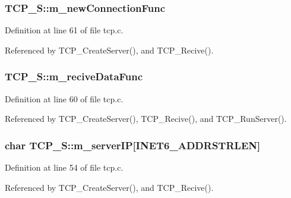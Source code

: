 \subsubsection[{\texorpdfstring{m\+\_\+new\+Connection\+Func}{m_newConnectionFunc}}]{ T\+C\+P\+\_\+\+S\+::m\+\_\+new\+Connection\+Func}\hypertarget{structTCP__S_a56336f3f871b6a2ed804c7d788bc1990}{}\label{structTCP__S_a56336f3f871b6a2ed804c7d788bc1990}


Definition at line 61 of file tcp.\+c.



Referenced by T\+C\+P\+\_\+\+Create\+Server(), and T\+C\+P\+\_\+\+Recive().

\subsubsection[{\texorpdfstring{m\+\_\+recive\+Data\+Func}{m_reciveDataFunc}}]{ T\+C\+P\+\_\+\+S\+::m\+\_\+recive\+Data\+Func}\hypertarget{structTCP__S_ab10be5833a35a4ae1a6e3a96547d5c2b}{}\label{structTCP__S_ab10be5833a35a4ae1a6e3a96547d5c2b}


Definition at line 60 of file tcp.\+c.



Referenced by T\+C\+P\+\_\+\+Create\+Server(), T\+C\+P\+\_\+\+Recive(), and T\+C\+P\+\_\+\+Run\+Server().

\subsubsection[{\texorpdfstring{m\+\_\+server\+IP}{m_serverIP}}]{\setlength{\rightskip}{0pt plus 5cm}char T\+C\+P\+\_\+\+S\+::m\+\_\+server\+IP\mbox{[}I\+N\+E\+T6\+\_\+\+A\+D\+D\+R\+S\+T\+R\+L\+EN\mbox{]}}\hypertarget{structTCP__S_a138ef40bec23d2e437f836991c85bf4b}{}\label{structTCP__S_a138ef40bec23d2e437f836991c85bf4b}


Definition at line 54 of file tcp.\+c.



Referenced by T\+C\+P\+\_\+\+Create\+Server(), and T\+C\+P\+\_\+\+Recive().

